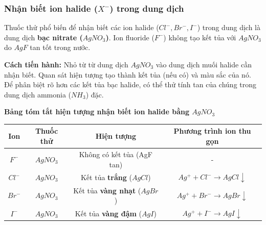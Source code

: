 \documentclass[Main.tex]{subfiles}
\begin{document}
    \subsubsection{Nhận biết ion halide ($X^-$) trong dung dịch}
	\begin{ghinho}
		Thuốc thử phổ biến để nhận biết các ion halide ($Cl^-, Br^-, I^-$) trong dung dịch là dung dịch \textbf{bạc nitrate ($AgNO_3$)}. Ion fluoride ($F^-$) không tạo kết tủa với $AgNO_3$ do $AgF$ tan tốt trong nước.
	\end{ghinho}
    \begin{hopdongian}       
        \textbf{Cách tiến hành:} Nhỏ từ từ dung dịch $AgNO_3$ vào dung dịch muối halide cần nhận biết. Quan sát hiện tượng tạo thành kết tủa (nếu có) và màu sắc của nó. Để phân biệt rõ hơn các kết tủa bạc halide, có thể thử tính tan của chúng trong dung dịch ammonia ($NH_3$) đặc.
    \end{hopdongian}
	\begin{center}
		\textbf{Bảng tóm tắt hiện tượng nhận biết ion halide bằng $AgNO_3$}
		\begin{tabular}{|c|c|c|c|}
			\hline
			\textbf{Ion} & \textbf{Thuốc thử} & \textbf{Hiện tượng} & \textbf{Phương trình ion thu gọn} \\
			\hline
			\rowcolor{gray!10} $F^-$ & $AgNO_3$ & Không có kết tủa (AgF tan) & - \\
			\hline
			$Cl^-$ & $AgNO_3$ & Kết tủa \textbf{trắng} ($AgCl$) & $Ag^+ + Cl^- \rightarrow AgCl\downarrow$ \\
			\hline
			\rowcolor{yellow!20} $Br^-$ & $AgNO_3$ & Kết tủa \textbf{vàng nhạt} ($AgBr$) & $Ag^+ + Br^- \rightarrow AgBr\downarrow$ \\
			\hline
			\rowcolor{yellow!50} $I^-$ & $AgNO_3$ & Kết tủa \textbf{vàng đậm} ($AgI$) & $Ag^+ + I^- \rightarrow AgI\downarrow$ \\
			\hline
		\end{tabular}
	\end{center}
\end{document}
